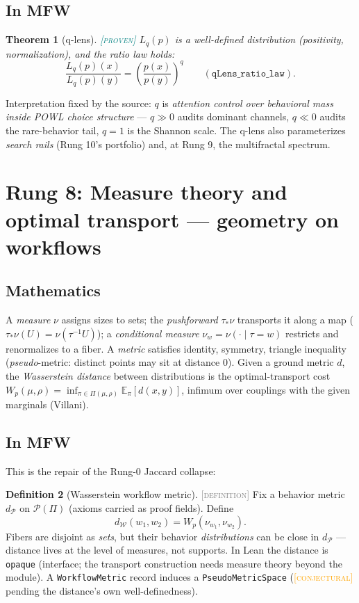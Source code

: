 \documentclass[11pt]{article}
\newcommand{\PROVEN}{\textcolor{teal}{\textsc{[proven]}}}
\newcommand{\DEFINITION}{\textcolor{gray}{\textsc{[definition]}}}
\newcommand{\CONJECTURAL}{\textcolor{orange}{\textsc{[conjectural]}}}
\newcommand{\PT}{\Pi}
\newcommand{\PS}{\mathcal{P}(\PT)}
\newcommand{\dW}{d_{\mathcal{W}}}
\newcommand{\dP}{d_{\mathcal{P}}}
\theoremstyle{plain}
\newtheorem{theorem}{Theorem}[section]
\theoremstyle{definition}
\newtheorem{definition}[theorem]{Definition}
\theoremstyle{remark}
\begin{document}
\subsection{In MFW}
\begin{theorem}[q-lens]\PROVEN\;
$L_q(p)$ is a well-defined distribution (positivity, normalization), and
the ratio law holds:
\[
  \frac{L_q(p)(x)}{L_q(p)(y)} = \left(\frac{p(x)}{p(y)}\right)^{q}
  \qquad (\texttt{qLens\_ratio\_law}).
\]
\end{theorem}
Interpretation fixed by the source: $q$ is \emph{attention control over
behavioral mass inside POWL choice structure} --- $q \gg 0$ audits dominant
channels, $q \ll 0$ audits the rare-behavior tail, $q = 1$ is the Shannon
scale. The q-lens also parameterizes \emph{search rails} (Rung 10's
portfolio) and, at Rung 9, the multifractal spectrum.

\section{Rung 8: Measure theory and optimal transport --- geometry on
workflows}
\label{sec:rung8}

\subsection{Mathematics}
A \emph{measure} $\nu$ assigns sizes to sets; the \emph{pushforward}
$\tau_*\nu$ transports it along a map ($\tau_*\nu(U) =
\nu(\tau^{-1}U)$); a \emph{conditional measure} $\nu_w =
\nu(\cdot \mid \tau = w)$ restricts and renormalizes to a fiber. A
\emph{metric} satisfies identity, symmetry, triangle inequality
(\emph{pseudo}-metric: distinct points may sit at distance 0). Given a
ground metric $d$, the \emph{Wasserstein distance} between distributions is
the optimal-transport cost
$W_p(\mu, \rho) = \inf_{\pi \in \Pi(\mu,\rho)} \mathbb{E}_\pi[d(x,y)]$,
infimum over couplings with the given marginals (Villani).

\subsection{In MFW}
This is the repair of the Rung-0 Jaccard collapse:
\begin{definition}[Wasserstein workflow metric]\DEFINITION\;
Fix a behavior metric $\dP$ on $\PS$ (axioms carried as proof fields).
Define
\[
  \dW(w_1, w_2) = W_p(\nu_{w_1}, \nu_{w_2}).
\]
Fibers are disjoint as \emph{sets}, but their behavior \emph{distributions}
can be close in $\dP$ --- distance lives at the level of measures, not
supports. In Lean the distance is \texttt{opaque} (interface; the transport
construction needs measure theory beyond the module). A
\texttt{WorkflowMetric} record induces a \texttt{PseudoMetricSpace}
(\CONJECTURAL{} pending the distance's own well-definedness).
\end{definition}
\end{document}
